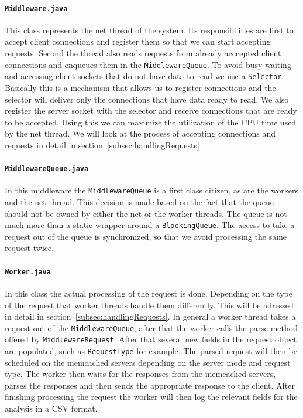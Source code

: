 \documentclass[11pt,a4paper]{article}
\begin{document}
\paragraph{\texttt{Middleware.java}}
%
This class represents the net thread of the system. Its responsibilities are first to accept client connections and register them so that we can start accepting requests. 
%
Second the thread also reads requests from already acccepted client connections and enqueues them in the \texttt{MiddlewareQueue}.
%
To avoid busy waiting and accessing client sockets that do not have data to read we use a \texttt{Selector}. 
%
Basically this is a mechanism that allows us to register connections and the selector will deliver only the connections that have data ready to read.
%
We also register the server socket with the selector and receive connections that are ready to be accepted.
%
Using this we can maximize the utilization of the CPU time used by the net thread.
%
We will look at the process of accepting connections and requests in detail in section~\ref{subsec:handlingRequests}
%
\paragraph{\texttt{MiddlewareQueue.java}}
%
In this middleware the \texttt{MiddlewareQueue} is a first class citizen, as are the workers and the net thread.
%
This decision is made based on the fact that the queue should not be owned by either the net or the worker threads.
%
The queue is not much more than a static wrapper around a \texttt{BlockingQueue}.
%
The access to take a request out of the queue is synchronized, so that we avoid processing the same request twice.
%
\paragraph{\texttt{Worker.java}}
%
In this class the actual processing of the request is done.
%
Depending on the type of the request that worker threads handle them differently. 
%
This will be adressed in detail in section~\ref{subsec:handlingRequests}.
%
In general a worker thread takes a request out of the \texttt{MiddlewareQueue}, after that the worker calls the parse method offered by \texttt{MiddlewareRequest}.
%
After that several new fields in the request object are populated, such as \texttt{RequestType} for example.
%
The parsed request will then be scheduled on the memcached servers depending on the server mode and request type.
%
The worker then waits for the responses from the memcached servers, parses the responses and then sends the appropriate response to the client.
%
After finishing processing the request the worker will then log the relevant fields for the analysis in a CSV format.
%
\end{document}
